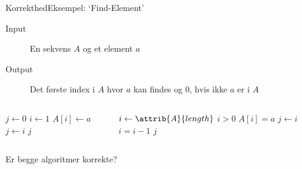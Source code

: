 \documentclass[aspectratio=1610]{beamer}
\begin{document}
\begin{frame}{Korrekthed}{Eksempel: `Find-Element'}
    \begin{description}
        \item[Input] En sekvens $A$ og et element $a$
        \item[Output] Det første index i $A$ hvor $a$ kan findes og 0, hvis ikke
            $a$ er i $A$
    \end{description}

    \pause
    \begin{columns}

        \begin{codebox}
            \li $j \gets 0$
            \li \For $i \gets 1$ \To {} \Do
                \li \If $A[i] \gets a$ \Then
                    \li $j \gets i$
                \End
            \End
            \li \Return $j$
        \end{codebox}



        \begin{codebox}
            \li $i \gets \attrib{A}{length}$
            \li \While $i > 0$ \Do
                \li \If $A[i] = a$ \Then
                    \li $j \gets i$
                \End
                \li $i = i - 1$
            \End
            \li \Return $j$
        \end{codebox}


    \end{columns}

    \medskip
    Er begge algoritmer korrekte? 
\end{frame}
\end{document}
